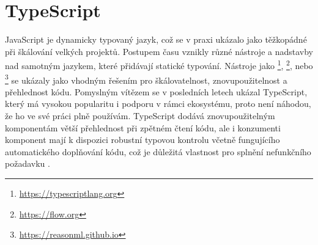 




\section{TypeScript}

JavaScript je dynamicky typovaný jazyk, což se v praxi ukázalo jako těžkopádné při škálování velkých projektů.
Postupem času vznikly různé nástroje a nadstavby nad samotným jazykem, které přidávají statické typování.
Nástroje jako \footnote{\url{https://typescriptlang.org}}, \footnote{\url{https://flow.org}}, nebo \footnote{\url{https://reasonml.github.io}} se ukázaly jako vhodným řešením pro škálovatelnost, znovupoužitelnost a přehlednost kódu.
Pomyslným vítězem se v posledních letech ukázal TypeScript, který má vysokou popularitu i podporu v rámci ekosystému, proto není náhodou, že ho ve své práci plně používám.
TypeScript dodává znovupoužitelným komponentám větší přehlednost při zpětném čtení kódu, ale i konzumenti komponent mají k dispozici robustní typovou kontrolu včetně fungujícího automatického doplňování kódu, což je důležitá vlastnost pro splnění nefunkčního požadavku \hyperref[nfr13]{}.

